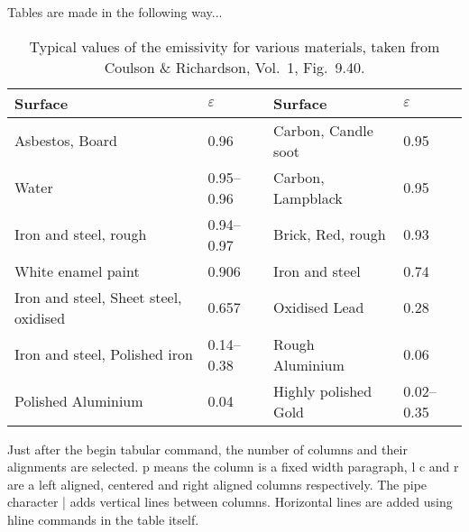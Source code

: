 \documentclass[12pt, BEng]{UoAThesis}
\begin{document}
Tables are made in the following way...
\begin{table}
  \begin{center}
    \begin{tabular}{|p{4cm}|p{2cm}|||p{4cm}|p{2cm}|}
      Surface & $\varepsilon$ & Surface & $\varepsilon$ 
      \\\hline\hline%
      Asbestos, Board & 0.96 & Carbon, Candle soot & 0.95 \\
      Water & 0.95--0.96 & Carbon, Lampblack & 0.95\\
      Iron and steel, rough & 0.94--0.97 & Brick, Red, rough & 0.93\\
      White enamel paint & 0.906 & Iron and steel & 0.74\\
      Iron and steel, Sheet steel, oxidised & 0.657 & Oxidised Lead  & 0.28\\
      Iron and steel, Polished iron & 0.14--0.38 & Rough Aluminium & 0.06\\
      Polished Aluminium & 0.04 & Highly polished Gold & 0.02--0.35
    \end{tabular}
  \end{center}
  \caption[Typical values of the emissivity for various materials]{
    Typical values of the emissivity for various materials, 
    taken from Coulson \& Richardson, Vol.~1, Fig.~9.40.}
\end{table}

Just after the begin tabular command, the number of columns and their
alignments are selected. p means the column is a fixed width
paragraph, l c and r are a left aligned, centered and right aligned
columns respectively. The pipe character | adds vertical lines between
columns. Horizontal lines are added using hline commands in the table
itself.
\end{document}
